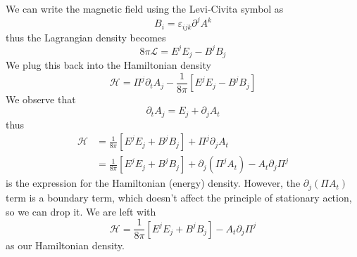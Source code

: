We can write the magnetic field using the Levi-Civita symbol as
\begin{equation}%
B_{i} = \varepsilon_{ijk}\partial^{j}A^{k}
\end{equation}
thus the Lagrangian density becomes
\begin{equation}%
8\pi\mathcal{L} = E^{j}E_{j}-B^{j}B_{j} 
\end{equation}
We plug this back into the Hamiltonian density
\begin{equation}%
\mathcal{H} = \Pi^{j}\partial_{t}A_{j}-\frac{1}{8\pi}\left[E^{j}E_{j}-B^{j}B_{j} \right]
\end{equation}
We observe that
\begin{equation}%
\partial_{t}A_{j} = E_{j} + \partial_{j}A_{t}
\end{equation}
thus
\begin{subequations}
\begin{align}
\mathcal{H} &= \frac{1}{8\pi}\left[E^{j}E_{j}+B^{j}B_{j}\right] + \Pi^{j}\partial_{j}A_{t}\\
&= \frac{1}{8\pi}\left[E^{j}E_{j}+B^{j}B_{j}\right] +
\partial_{j}(\Pi^{j}A_{t}) - A_{t}\partial_{j}\Pi^{j}
\end{align}
\end{subequations}
is the expression for the Hamiltonian (energy) density. However,
the $\partial_{j}(\Pi A_{t})$ term is a boundary term, which
doesn't affect the principle of stationary action, so we can drop
it. We are left with
\begin{equation}%
\mathcal{H} = \frac{1}{8\pi}\left[E^{j}E_{j}+B^{j}B_{j}\right] - A_{t}\partial_{j}\Pi^{j}
\end{equation}
as our Hamiltonian density.


